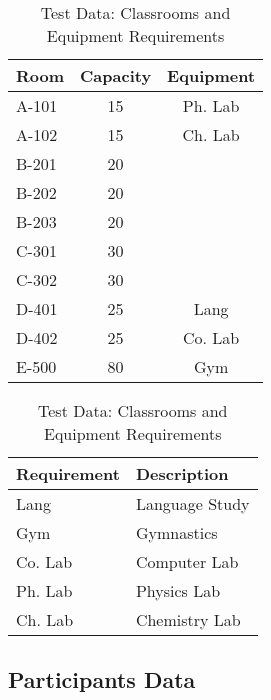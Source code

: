 \documentclass[../header]{subfiles}
\begin{document}

\begin{table}[H]\caption{Test Data: Classrooms and Equipment Requirements}
\label{data:classrooms}
  \centering
  \begin{tabular}{|lcc|}
    \hline
    Room  & Capacity & Equipment \\\hline\hline
    A-101 & 15 & Ph. Lab   \\
    A-102 & 15 & Ch. Lab   \\\hline
    B-201 & 20 & \\
    B-202 & 20 & \\
    B-203 & 20 & \\
    C-301 & 30 & \\
    C-302 & 30 & \\\hline
    D-401 & 25 & Lang \\
    D-402 & 25 & Co. Lab \\\hline
    E-500 & 80 & Gym \\\hline
  \end{tabular}
  \hfill
  \begin{tabular}{|ll|}
    \hline
    Requirement & Description \\\hline\hline
    Lang    & Language Study \\
    Gym     & Gymnastics   \\
    Co. Lab & Computer Lab \\
    Ph. Lab & Physics Lab  \\
    Ch. Lab & Chemistry Lab \\\hline
  \end{tabular}
\end{table}


\subsection{Participants Data}
\end{document}
